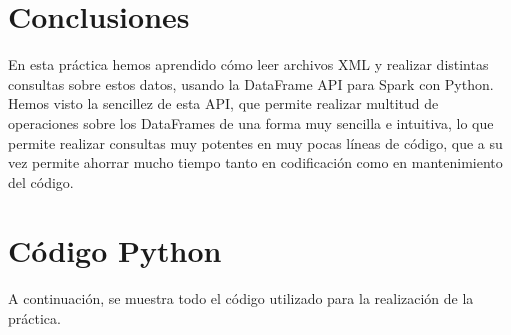\documentclass[12pt,a4paper,twoside,openright,titlepage,final]{article}
\begin{document}
\section{Conclusiones}

En esta práctica hemos aprendido cómo leer archivos XML y realizar distintas consultas sobre estos datos, usando la DataFrame API para Spark con Python. Hemos visto la sencillez de esta API, que permite realizar multitud de operaciones sobre los DataFrames de una forma muy sencilla e intuitiva, lo que permite realizar consultas muy potentes en muy pocas líneas de código, que a su vez permite ahorrar mucho tiempo tanto en codificación como en mantenimiento del código.

\newpage

\section{Código Python}

A continuación, se muestra todo el código utilizado para la realización de la práctica.

\inputminted{python}{../codigo/queries.py}
\end{document}

